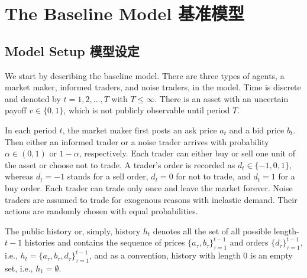 \documentclass[12pt,a4paper]{article}
\newenvironment{original}{%
  \par\vspace{4pt}\noindent%
  \color{black}%
  \ignorespaces
}{%
  \par\vspace{2pt}%
}
\begin{document}
\newpage

\section{The Baseline Model \hfill 基准模型}

\subsection{Model Setup \hfill 模型设定}

\begin{original}
We start by describing the baseline model. There are three types of agents, a market maker, informed traders, and noise traders, in the model. Time is discrete and denoted by $t = 1, 2, \ldots, T$ with $T \leq \infty$. There is an asset with an uncertain payoff $v \in \{0, 1\}$, which is not publicly observable until period $T$.

In each period $t$, the market maker first posts an ask price $a_t$ and a bid price $b_t$. Then either an informed trader or a noise trader arrives with probability $\alpha \in (0, 1)$ or $1 - \alpha$, respectively. Each trader can either buy or sell one unit of the asset or choose not to trade. A trader's order is recorded as $d_t \in \{-1, 0, 1\}$, whereas $d_t = -1$ stands for a sell order, $d_t = 0$ for not to trade, and $d_t = 1$ for a buy order. Each trader can trade only once and leave the market forever. Noise traders are assumed to trade for exogenous reasons with inelastic demand. Their actions are randomly chosen with equal probabilities.

The public history or, simply, history $h_t$ denotes all the set of all possible length-$t-1$ histories and contains the sequence of prices $\{a_\tau, b_\tau\}_{\tau=1}^{t-1}$ and orders $\{d_\tau\}_{\tau=1}^{t-1}$, i.e., $h_t = \{a_\tau, b_\tau, d_\tau\}_{\tau=1}^{t-1}$, and as a convention, history with length 0 is an empty set, i.e., $h_1 = \emptyset$.
\end{original}
\end{document}
